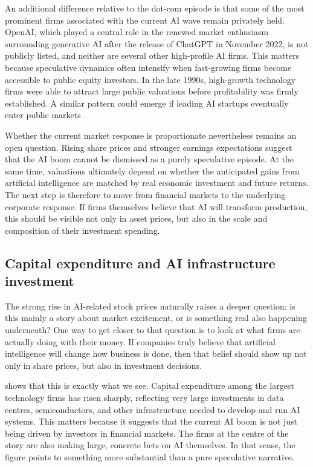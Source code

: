 An additional difference relative to the dot-com episode is that some of the most prominent firms associated with the current AI wave remain privately held. OpenAI, which played a central role in the renewed market enthusiasm surrounding generative AI after the release of ChatGPT in November 2022, is not publicly listed, and neither are several other high-profile AI firms. This matters because speculative dynamics often intensify when fast-growing firms become accessible to public equity investors. In the late 1990s, high-growth technology firms were able to attract large public valuations before profitability was firmly established. A similar pattern could emerge if leading AI startups eventually enter public markets \citep{capitalIdeas2025}.

Whether the current market response is proportionate nevertheless remains an open question. Rising share prices and stronger earnings expectations suggest that the AI boom cannot be dismissed as a purely speculative episode. At the same time, valuations ultimately depend on whether the anticipated gains from artificial intelligence are matched by real economic investment and future returns. The next step is therefore to move from financial markets to the underlying corporate response. If firms themselves believe that AI will transform production, this should be visible not only in asset prices, but also in the scale and composition of their investment spending.

\subsection{Capital expenditure and AI infrastructure investment}
\label{subsec:capex-ai-investment}

The strong rise in AI-related stock prices naturally raises a deeper question: is this mainly a story about market excitement, or is something real also happening underneath? One way to get closer to that question is to look at what firms are actually doing with their money. If companies truly believe that artificial intelligence will change how business is done, then that belief should show up not only in share prices, but also in investment decisions.

 shows that this is exactly what we see. Capital expenditure among the largest technology firms has risen sharply, reflecting very large investments in data centres, semiconductors, and other infrastructure needed to develop and run AI systems. This matters because it suggests that the current AI boom is not just being driven by investors in financial markets. The firms at the centre of the story are also making large, concrete bets on AI themselves. In that sense, the figure points to something more substantial than a pure speculative narrative. 

